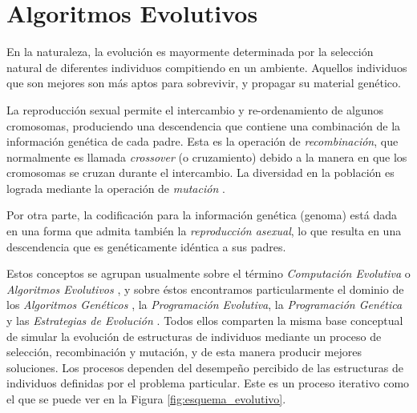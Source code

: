 \section{Algoritmos Evolutivos}
En la naturaleza, la evolución es mayormente determinada por la selección natural de diferentes individuos compitiendo en un ambiente. Aquellos individuos que son mejores son más aptos para sobrevivir, y propagar su material genético. 

La reproducción sexual permite el intercambio y re-ordenamiento de algunos cromosomas, produciendo una descendencia que contiene una combinación de la información genética de cada padre. Esta es la operación de \emph{recombinación}, que normalmente es llamada \emph{crossover} (o cruzamiento) debido a la manera en que los cromosomas se cruzan durante el intercambio. La diversidad en la población es lograda mediante la operación de \emph{mutación} \cite{grosan2011intelligent}.

Por otra parte, la codificación para la información genética (genoma) está dada en una forma que admita también la {\em reproducción asexual}, lo que resulta en una descendencia que es genéticamente idéntica a sus padres.


Estos conceptos se agrupan usualmente sobre el término \emph{Computación Evolutiva} o \emph{Algoritmos Evolutivos} \cite{back1997handbook,back1996evolutionary}, y sobre éstos encontramos particularmente el dominio de los \emph{Algoritmos Genéticos} \cite{holland1992adaptation,goldberg1989genetic}, la \emph{Programación Evolutiva}\cite{fogel1966artificial}, la \emph{Programación Genética} \cite{koza1992genetic,michalewicz1996genetic} y las \emph{Estrategias de Evolución} \cite{vent1975rechenberg,schwefel1977evolutionsstrategien}. Todos ellos comparten la misma base conceptual de simular la evolución de estructuras de individuos mediante un proceso de selección, recombinación y mutación, y de esta manera producir mejores soluciones. Los procesos dependen del desempeño percibido de las estructuras de individuos definidas por el problema particular. Este es un proceso iterativo como el que se puede ver en la Figura \ref{fig:esquema_evolutivo}.

